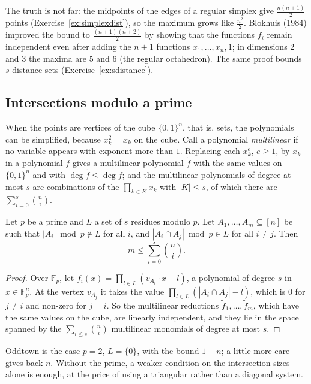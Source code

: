 The truth is not far: the midpoints of the edges of a regular simplex give $\frac{n(n+1)}2$ points (Exercise~\ref{ex:simplexdist}), so the maximum grows like $\frac{n^2}2$. Blokhuis (1984) improved the bound to
$\frac{(n+1)(n+2)}2$ by showing that the functions $f_i$ remain independent even after adding the $n+1$ functions $x_1,\dots,x_n,1$; in dimensions $2$ and $3$ the maxima are $5$ and $6$ (the regular octahedron).
The same proof bounds $s$-distance sets (Exercise~\ref{ex:sdistance}).

\subsection*{Intersections modulo a prime}

When the points are vertices of the cube $\{0,1\}^n$, that is, sets, the polynomials can be simplified, because $x_k^2=x_k$ on the cube. Call a polynomial \emph{multilinear} if no variable appears with
exponent more than $1$. Replacing each $x_k^e$, $e\ge1$, by $x_k$ in a polynomial $f$ gives a multilinear polynomial $\tilde f$ with the same values on $\{0,1\}^n$ and with $\deg\tilde f\le\deg f$; and the
multilinear polynomials of degree at most $s$ are combinations of the $\prod_{k\in K}x_k$ with $|K|\le s$, of which there are $\sum_{i=0}^s\binom ni$.

\begin{theorem}\label{thm:fwmod}
Let $p$ be a prime and $L$ a set of $s$ residues modulo $p$. Let $A_1,\dots,A_m\subseteq[n]$ be such that $|A_i|\bmod p\notin L$ for all $i$, and $|A_i\cap A_j|\bmod p\in L$ for all $i\ne j$. Then
\[
m\le\sum_{i=0}^s\binom ni.
\]
\end{theorem}
\begin{proof}
Over $\mathbb F_p$, let $f_i(x)=\prod_{l\in L}(v_{A_i}\cdot x-l)$, a polynomial of degree $s$ in $x\in\mathbb F_p^n$. At the vertex $v_{A_j}$ it takes the value $\prod_{l\in L}(|A_i\cap A_j|-l)$, which is $0$ for $j\ne i$ and non-zero for
$j=i$. So the multilinear reductions $\tilde f_1,\dots,\tilde f_m$, which have the same values on the cube, are linearly independent, and they lie in the space spanned by the $\sum_{i\le s}\binom ni$
multilinear monomials of degree at most $s$.
\end{proof}

Oddtown is the case $p=2$, $L=\{0\}$, with the bound $1+n$; a little more care gives back $n$. Without the prime, a weaker condition on the intersection sizes alone is enough, at the price of using a triangular
rather than a diagonal system.

